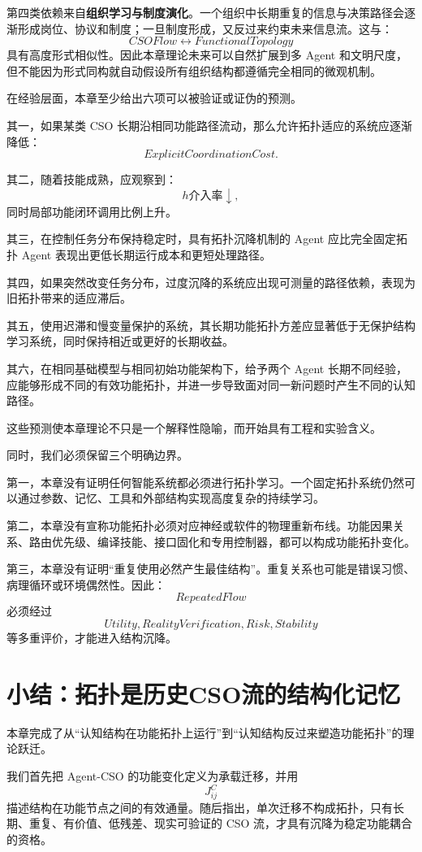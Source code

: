 第四类依赖来自\textbf{组织学习与制度演化}。一个组织中长期重复的信息与决策路径会逐渐形成岗位、协议和制度；一旦制度形成，又反过来约束未来信息流。这与：
\[
CSOFlow
\leftrightarrow
FunctionalTopology
\]
具有高度形式相似性。因此本章理论未来可以自然扩展到多 Agent 和文明尺度，但不能因为形式同构就自动假设所有组织结构都遵循完全相同的微观机制。

在经验层面，本章至少给出六项可以被验证或证伪的预测。

其一，如果某类 CSO 长期沿相同功能路径流动，那么允许拓扑适应的系统应逐渐降低：
\[
ExplicitCoordinationCost.
\]

其二，随着技能成熟，应观察到：
\[
h\text{介入率}\downarrow,
\]
同时局部功能闭环调用比例上升。

其三，在控制任务分布保持稳定时，具有拓扑沉降机制的 Agent 应比完全固定拓扑 Agent 表现出更低长期运行成本和更短处理路径。

其四，如果突然改变任务分布，过度沉降的系统应出现可测量的路径依赖，表现为旧拓扑带来的适应滞后。

其五，使用迟滞和慢变量保护的系统，其长期功能拓扑方差应显著低于无保护结构学习系统，同时保持相近或更好的长期收益。

其六，在相同基础模型与相同初始功能架构下，给予两个 Agent 长期不同经验，应能够形成不同的有效功能拓扑，并进一步导致面对同一新问题时产生不同的认知路径。

这些预测使本章理论不只是一个解释性隐喻，而开始具有工程和实验含义。

同时，我们必须保留三个明确边界。

第一，本章没有证明任何智能系统都必须进行拓扑学习。一个固定拓扑系统仍然可以通过参数、记忆、工具和外部结构实现高度复杂的持续学习。

第二，本章没有宣称功能拓扑必须对应神经或软件的物理重新布线。功能因果关系、路由优先级、编译技能、接口固化和专用控制器，都可以构成功能拓扑变化。

第三，本章没有证明``重复使用必然产生最佳结构''。重复关系也可能是错误习惯、病理循环或环境偶然性。因此：
\[
RepeatedFlow
\]
必须经过
\[
Utility,
RealityVerification,
Risk,
Stability
\]
等多重评价，才能进入结构沉降。


\section{小结：拓扑是历史CSO流的结构化记忆}

本章完成了从``认知结构在功能拓扑上运行''到``认知结构反过来塑造功能拓扑''的理论跃迁。

我们首先把 Agent-CSO 的功能变化定义为承载迁移，并用
\[
J_{ij}^{C}
\]
描述结构在功能节点之间的有效通量。随后指出，单次迁移不构成拓扑，只有长期、重复、有价值、低残差、现实可验证的 CSO 流，才具有沉降为稳定功能耦合的资格。

